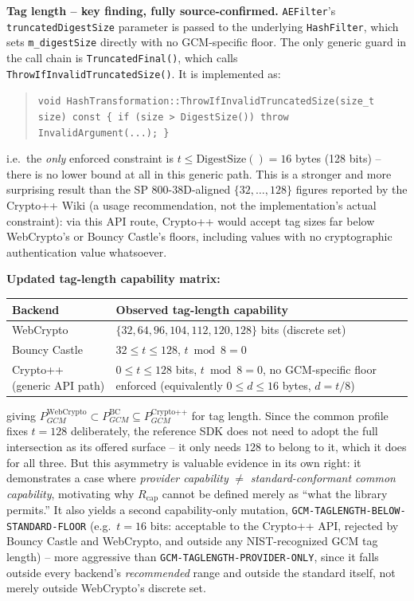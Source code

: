 \documentclass[11pt,a4paper]{article}
\begin{document}
\textbf{Tag length -- key finding, fully source-confirmed.} \texttt{AEFilter}'s \texttt{truncatedDigestSize} parameter is passed to the underlying \texttt{HashFilter}, which sets \texttt{m\_digestSize} directly with no GCM-specific floor. The only generic guard in the call chain is \texttt{TruncatedFinal()}, which calls \texttt{ThrowIfInvalidTruncatedSize()}. It is implemented as:
\begin{quote}
\texttt{void HashTransformation::ThrowIfInvalidTruncatedSize(size\_t size) const \{ if (size > DigestSize()) throw InvalidArgument(...); \}}
\end{quote}
i.e.\ the \emph{only} enforced constraint is $t \le \text{DigestSize}() = 16$ bytes (128 bits) -- there is no lower bound at all in this generic path. This is a stronger and more surprising result than the SP 800-38D-aligned $\{32,\ldots,128\}$ figures reported by the Crypto++ Wiki (a usage recommendation, not the implementation's actual constraint): via this API route, Crypto++ would accept tag sizes far below WebCrypto's or Bouncy Castle's floors, including values with no cryptographic authentication value whatsoever.

\textbf{Updated tag-length capability matrix:}
\begin{center}
\begin{tabularx}{\textwidth}{@{}l>{\raggedright\arraybackslash}X@{}}
\toprule
Backend & Observed tag-length capability \\
\midrule
WebCrypto & $\{32,64,96,104,112,120,128\}$ bits (discrete set) \\
Bouncy Castle & $32 \le t \le 128$, $t \bmod 8 = 0$ \\
Crypto++ (generic API path) & $0 \le t \le 128$ bits, $t \bmod 8 = 0$, no GCM-specific floor enforced (equivalently $0 \le d \le 16$ bytes, $d = t/8$) \\
\bottomrule
\end{tabularx}
\end{center}
giving $P_{GCM}^{\text{WebCrypto}} \subset P_{GCM}^{\text{BC}} \subseteq P_{GCM}^{\text{Crypto++}}$ for tag length. Since the common profile fixes $t=128$ deliberately, the reference SDK does not need to adopt the full intersection as its offered surface -- it only needs $128$ to belong to it, which it does for all three. But this asymmetry is valuable evidence in its own right: it demonstrates a case where \emph{provider capability} $\ne$ \emph{standard-conformant common capability}, motivating why $R_{\text{cap}}$ cannot be defined merely as ``what the library permits.'' It also yields a second capability-only mutation, \texttt{GCM-TAGLENGTH-BELOW-STANDARD-FLOOR} (e.g.\ $t=16$ bits: acceptable to the Crypto++ API, rejected by Bouncy Castle and WebCrypto, and outside any NIST-recognized GCM tag length) -- more aggressive than \texttt{GCM-TAGLENGTH-PROVIDER-ONLY}, since it falls outside every backend's \emph{recommended} range and outside the standard itself, not merely outside WebCrypto's discrete set.
\end{document}
